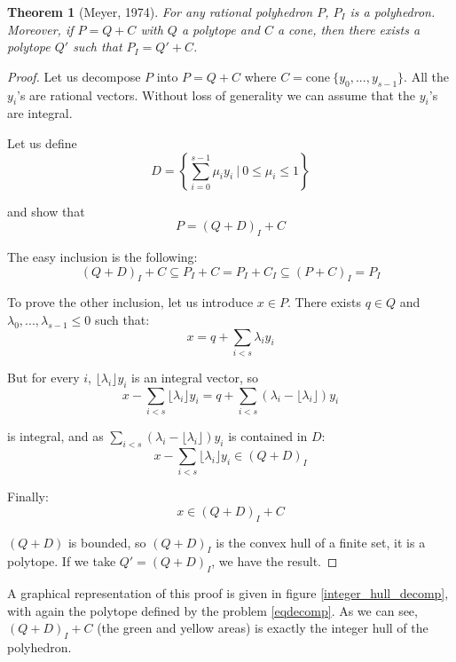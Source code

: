 \documentclass{article}
\newcommand{\cone}{\mathrm{cone}}
\newtheorem{theorem}{Theorem}
\begin{document}
\begin{theorem}[Meyer, 1974]
\label{meyer theorem}
  For any rational polyhedron $P$, $P_I$ is a polyhedron. Moreover, if
  $P = Q + C$ with $Q$ a polytope and $C$ a cone, then there exists a polytope
  $Q'$ such that $P_I = Q' + C$.
\end{theorem}
\begin{proof}
  Let us decompose $P$ into $P = Q + C$ where
  $C = \cone~\{y_0, ..., y_{s-1}\}$. All the $y_i$'s are rational vectors.
  Without loss of generality we can assume that the $y_i$'s are integral.

  Let us define
  $$D = \left\{\sum_{i=0}^{s-1} \mu_i y_i~|~
               0 \leqslant \mu_i \leqslant 1\right\}$$

  and show that $$P = (Q + D)_I + C$$

  The easy inclusion is the following:
  $$(Q + D)_I + C \subseteq P_I + C = P_I + C_I \subseteq (P + C)_I = P_I$$

  To prove the other inclusion, let us introduce $x \in P$.
  There exists $q \in Q$ and $\lambda_0, ..., \lambda_{s-1}
  \leqslant 0$ such that: $$x = q + \sum_{i < s} \lambda_i y_i$$
  
  But for every
  $i$, $\lfloor \lambda_i \rfloor y_i$ is an integral vector, so
  $$x - \sum_{i<s} \lfloor \lambda_i \rfloor y_i=
      q + \sum_{i<s} (\lambda_i - \lfloor \lambda_i \rfloor) y_i$$

  is integral, and as $\sum_{i<s} (\lambda_i - \lfloor \lambda_i \rfloor) y_i$
  is contained in $D$:
  $$x - \sum_{i<s} \lfloor \lambda_i \rfloor y_i \in (Q + D)_I$$

  Finally: $$x \in (Q + D)_I + C$$

  $(Q + D)$ is bounded, so $(Q + D)_I$ is the convex hull of a finite set, it is
  a polytope. If we take $Q' = (Q + D)_I$, we have the result.
\end{proof}

A graphical representation of this proof is given in figure
\ref{integer_hull_decomp}, with again the polytope defined by the problem
\ref{eqdecomp}. As we can see, $(Q + D)_I + C$ (the
green and yellow areas) is exactly the integer hull of the polyhedron.
\end{document}
